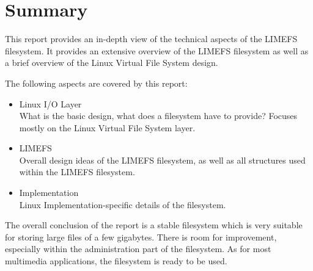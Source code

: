 \chapter{Summary}

This report provides an in-depth view of the technical aspects of the LIMEFS filesystem. It provides an extensive overview of the LIMEFS filesystem as well as a brief overview of the Linux Virtual File System design.

The following aspects are covered by this report:

\begin{itemize}
\item Linux I/O Layer \\
What is the basic design, what does a filesystem have to provide? Focuses mostly on the Linux Virtual File System layer.
\item LIMEFS \\
Overall design ideas of the LIMEFS filesystem, as well as all structures used within the LIMEFS filesystem.
\item Implementation \\
Linux Implementation-specific details of the filesystem.
\end{itemize}

The overall conclusion of the report is a stable filesystem which is very suitable for storing large files of a few gigabytes. There is room for improvement, especially within the administration part of the filesystem. As for most multimedia applications, the filesystem is ready to be used.
